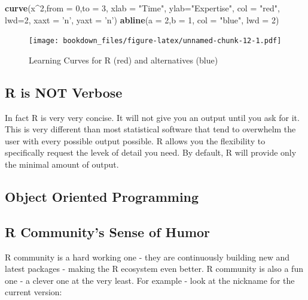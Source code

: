 \documentclass[]{krantz}
\makeatletter
\newenvironment{Shaded}{\begin{snugshade}}{\end{snugshade}}
\newcommand{\KeywordTok}[1]{\textcolor[rgb]{0.27,0.27,0.27}{\textbf{#1}}}
\newcommand{\DataTypeTok}[1]{\textcolor[rgb]{0.27,0.27,0.27}{#1}}
\newcommand{\DecValTok}[1]{\textcolor[rgb]{0.06,0.06,0.06}{#1}}
\newcommand{\StringTok}[1]{\textcolor[rgb]{0.5,0.5,0.5}{#1}}
\newcommand{\OperatorTok}[1]{\textcolor[rgb]{0.81,0.36,0.00}{\textbf{#1}}}
\newcommand{\NormalTok}[1]{#1}
\newenvironment{kframe}{%
\medskip{}
\setlength{\fboxsep}{.8em}
 \def\at@end@of@kframe{}%
 \ifinner\ifhmode%
  \def\at@end@of@kframe{\end{minipage}}%
  \begin{minipage}{\columnwidth}%
 \fi\fi%
 \def\FrameCommand##1{\hskip\@totalleftmargin \hskip-\fboxsep
 \colorbox{shadecolor}{##1}\hskip-\fboxsep
     \hskip-\linewidth \hskip-\@totalleftmargin \hskip\columnwidth}%
 \MakeFramed {\advance\hsize-\width
   \@totalleftmargin\z@ \linewidth\hsize
   \@setminipage}}%
 {\par\unskip\endMakeFramed%
 \at@end@of@kframe}
\renewenvironment{Shaded}{\begin{kframe}}{\end{kframe}}
\theoremstyle{definition}
\theoremstyle{definition}
\theoremstyle{definition}
\theoremstyle{remark}
\makeatother
\begin{document}
\begin{Shaded}
\begin{Highlighting}[]
\KeywordTok{curve}\NormalTok{(x}\OperatorTok{^}\DecValTok{2}\NormalTok{,}\DataTypeTok{from =} \DecValTok{0}\NormalTok{,}\DataTypeTok{to =} \DecValTok{3}\NormalTok{, }\DataTypeTok{xlab =} \StringTok{"Time"}\NormalTok{, }\DataTypeTok{ylab=}\StringTok{"Expertise"}\NormalTok{, }
      \DataTypeTok{col =} \StringTok{"red"}\NormalTok{, }\DataTypeTok{lwd=}\DecValTok{2}\NormalTok{, }\DataTypeTok{xaxt =} \StringTok{'n'}\NormalTok{, }\DataTypeTok{yaxt =} \StringTok{'n'}\NormalTok{)}
\KeywordTok{abline}\NormalTok{(}\DataTypeTok{a =} \DecValTok{2}\NormalTok{,}\DataTypeTok{b =} \DecValTok{1}\NormalTok{, }\DataTypeTok{col =} \StringTok{"blue"}\NormalTok{, }\DataTypeTok{lwd =} \DecValTok{2}\NormalTok{)}
\end{Highlighting}
\end{Shaded}

\begin{figure}
\centering
\texttt{[image: bookdown\_files/figure-latex/unnamed-chunk-12-1.pdf]}
\caption{\label{fig:unnamed-chunk-12}Learning Curves for R (red) and
alternatives (blue)}
\end{figure}

\subsection{R is NOT Verbose}\label{r-is-not-verbose}

In fact R is very very concise. It will not give you an output until you
ask for it. This is very different than most statistical software that
tend to overwhelm the user with every possible output possible. R allows
you the flexibility to specifically request the levek of detail you
need. By default, R will provide only the minimal amount of output.

\subsection{Object Oriented
Programming}\label{object-oriented-programming}

\subsection{R Community's Sense of
Humor}\label{r-communitys-sense-of-humor}

R community is a hard working one - they are continuously building new
and latest packages - making the R ecosystem even better. R community is
also a fun one - a clever one at the very least. For example - look at
the nickname for the current version:
\end{document}
